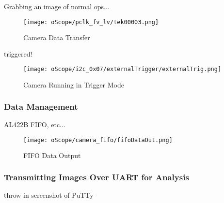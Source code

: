 \par
Grabbing an image of normal ops...
\begin{figure}[H]
	\centerline{\texttt{[image: oScope/pclk\_fv\_lv/tek00003.png]}}
	\caption{Camera Data Transfer}
	\label{camDataTransfer}
\end{figure}

\par
triggered!

\begin{figure}[H]
	\centerline{\texttt{[image: oScope/i2c\_0x07/externalTrigger/externalTrig.png]}}
	\caption{Camera Running in Trigger Mode}
	\label{camInTrigMode}
\end{figure}


\subsubsection{Data Management}
AL422B FIFO, etc...

\begin{figure}[H]
	\centerline{\texttt{[image: oScope/camera\_fifo/fifoDataOut.png]}}
	\caption{FIFO Data Output}
	\label{fifoDataOut}
\end{figure}

\subsubsection{Transmitting Images Over UART for Analysis}
throw in screenshot of PuTTy